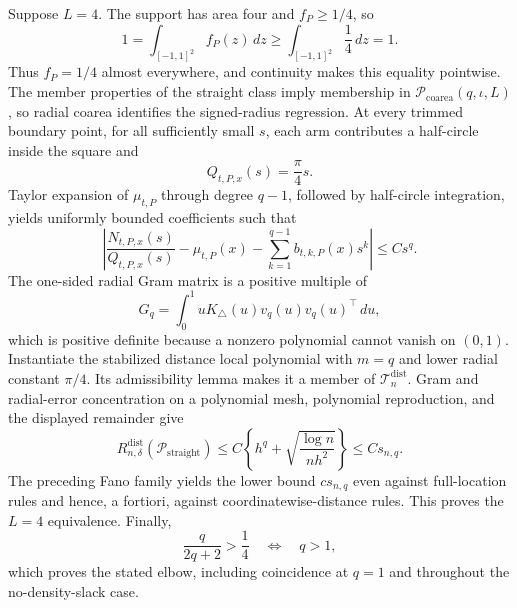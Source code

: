 Suppose \(L=4\).  The support has area four and \(f_P\geq1/4\), so
\[
 1=\int_{[-1,1]^2}f_P(z)\,dz
 \geq\int_{[-1,1]^2}\frac14\,dz=1.
\]
Thus \(f_P=1/4\) almost everywhere, and continuity makes this equality pointwise.  The member properties of the straight class imply membership in \(\mathcal P_{\mathrm{coarea}}(q,\iota,L)\), so radial coarea identifies the signed-radius regression.  At every trimmed boundary point, for all sufficiently small \(s\), each arm contributes a half-circle inside the square and
\[
 Q_{t,P,x}(s)=\frac\pi4s.
\]
Taylor expansion of \(\mu_{t,P}\) through degree \(q-1\), followed by half-circle integration, yields uniformly bounded coefficients such that
\[
 \left|\frac{N_{t,P,x}(s)}{Q_{t,P,x}(s)}-\mu_{t,P}(x)
 -\sum_{k=1}^{q-1}b_{t,k,P}(x)s^k\right|\leq Cs^q.
\]
The one-sided radial Gram matrix is a positive multiple of
\[
 G_q=\int_0^1uK_\triangle(u)v_q(u)v_q(u)^\top\,du,
\]
which is positive definite because a nonzero polynomial cannot vanish on \((0,1)\).  Instantiate the stabilized distance local polynomial with \(m=q\) and lower radial constant \(\pi/4\).  Its admissibility lemma makes it a member of \(\mathcal T_n^{\mathrm{dist}}\).  Gram and radial-error concentration on a polynomial mesh, polynomial reproduction, and the displayed remainder give
\[
 R_{n,\delta}^{\mathrm{dist}}(\mathcal P_{\mathrm{straight}})
 \leq C\left\{h^q+\sqrt{\frac{\log n}{nh^2}}\right\}
 \leq Cs_{n,q}.
\]
The preceding Fano family yields the lower bound \(cs_{n,q}\) even against full-location rules and hence, a fortiori, against coordinatewise-distance rules.  This proves the \(L=4\) equivalence.  Finally,
\[
 \frac{q}{2q+2}>\frac14\quad\Longleftrightarrow\quad q>1,
\]
which proves the stated elbow, including coincidence at \(q=1\) and throughout the no-density-slack case.